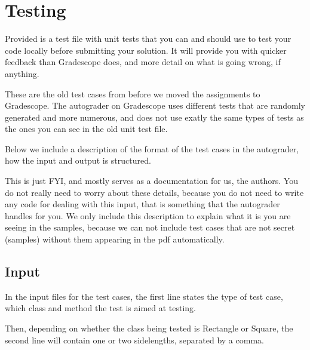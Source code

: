 \section*{Testing}

Provided is a test file with unit tests that you can and should use
to test your code locally before submitting your solution.
It will provide you with quicker feedback than Gradescope does,
and more detail on what is going wrong, if anything.

These are the old test cases
from before we moved the assignments to Gradescope.
The autograder on Gradescope uses different tests
that are randomly generated and more numerous,
and does not use exatly the same types of tests
as the ones you can see in the old unit test file.

Below we include a description of the format
of the test cases in the autograder,
how the input and output is structured.

This is just FYI, and mostly serves as a documentation for us, the authors.
You do not really need to worry about these details,
because you do not need to write any code for dealing with this input,
that is something that the autograder handles for you.
We only include this description to explain what it is you are seeing in the samples,
because we can not include test cases that are not secret (samples)
without them appearing in the pdf automatically.


\subsection*{Input}

In the input files for the test cases,
the first line states the type of test case,
which class and method the test is aimed at testing.

Then, depending on whether the class being tested is Rectangle or Square,
the second line will contain one or two sidelengths, separated by a comma.




